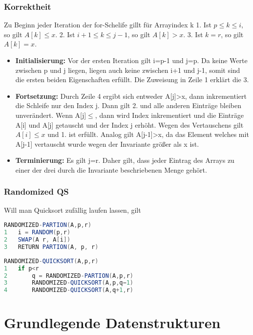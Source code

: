 \documentclass[jou,apacite]{apa6}
\begin{document}
\subsubsection{Korrektheit}
Zu Beginn jeder Iteration der for-Schelife gillt für Arrayindex k 1. Ist $p\le k \le i$, so gilt $A[k]\le x$. 2. Ist $i+1\le k \le j-1$, so gilt $A[k]>x$. 3. Ist $k=r$, so gilt $A[k]=x$.\\
\begin{itemize}
\item {\bfseries Initialisierung:} Vor der ersten Iteration gilt i=p-1 und j=p. Da keine Werte zwischen p und j liegen, liegen auch keine zwischen i+1 und j-1, somit sind die ersten beiden Eigenschaften erfüllt. Die Zuweisung in Zeile 1 erklärt die 3. 
\item {\bfseries Fortsetzung:}
Durch Zeile 4 ergibt sich entweder A[j]>x, dann inkrementiert die Schleife nur den Index j. Dann gilt 2. und alle anderen Einträge bleiben unverändert. Wenn A[j]$\le$, dann wird Index inkrementiert und die Einträge A[i] und A[j] getauscht und der Index j erhöht. Wegen des Vertauschens gilt $A[i]\le x$ und 1. ist erfüllt. Analog gilt A[j-1]>x, da das Element welches mit A[j-1] vertauscht wurde wegen der Invariante größer als x ist. 
\item {\bfseries Terminierung:} Es gilt j=r. Daher gilt, dass jeder Eintrag des Arrays zu einer der drei durch die Invariante beschriebenen Menge gehört.
\end{itemize}

\subsubsection{Randomized QS}
Will man Quicksort zufällig laufen lassen, gilt

\begin{lstlisting}[language=java]
RANDOMIZED-PARTION(A,p,r)
1   i = RANDOM(p,r)
2   SWAP(A r, A[i])
3   RETURN PARTION(A, p, r)
\end{lstlisting}

\begin{lstlisting}[language=java]
RANDOMIZED-QUICKSORT(A,p,r)
1   if p<r
2       q = RANDOMIZED-PARTION(A,p,r)
3       RANDOMIZED-QUICKSORT(A,p,q−1)
4       RANDOMIZED-QUICKSORT(A,q+1,r)
\end{lstlisting}



\section{Grundlegende Datenstrukturen}
\end{document}
